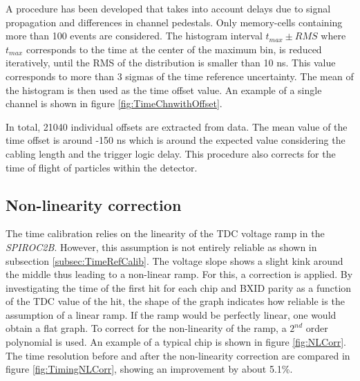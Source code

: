 \documentclass{JINST}
\begin{document}
A procedure has been developed that takes into account delays due to signal propagation and differences in channel pedestals. Only memory-cells containing more than 100 events are considered. The histogram interval $t_{max} \pm RMS$ where $t_{max}$ corresponds to the time at the center of the maximum bin, is reduced iteratively, until the RMS of the distribution is smaller than 10 ns. This value corresponds to more than 3 sigmas of the time reference uncertainty. The mean of the histogram is then used as the time offset value. An example of a single channel is shown in figure \ref{fig:TimeChnwithOffset}.

In total, 21040 individual offsets are extracted from data. The mean value of the time offset is around -150 ns which is around the expected value considering the cabling length and the trigger logic delay. This procedure also corrects for the time of flight of particles within the detector.

\subsection{Non-linearity correction}
\label{sec:Non-linCorr}

The time calibration relies on the linearity of the TDC voltage ramp in the \textit{SPIROC2B}. However, this assumption is not entirely reliable as shown in subsection \ref{subsec:TimeRefCalib}. The voltage slope shows a slight kink around the middle thus leading to a non-linear ramp. For this, a correction is applied. By investigating the time of the first hit for each chip and BXID parity as a function of the TDC value of the hit, the shape of the graph indicates how reliable is the assumption of a linear ramp. If the ramp would be perfectly linear, one would obtain a flat graph. To correct for the non-linearity of the ramp, a $2^{nd}$ order polynomial is used. An example of a typical chip is shown in figure \ref{fig:NLCorr}. The time resolution before and after the non-linearity correction are compared in figure \ref{fig:TimingNLCorr}, showing an improvement by about 5.1\%.
\end{document}
